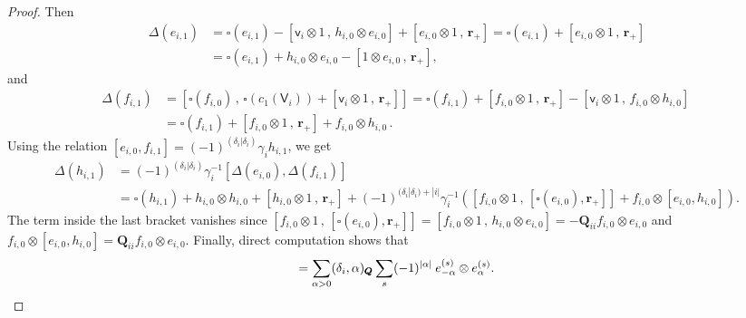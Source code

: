 \documentclass[10pt]{amsart}
\theoremstyle{definition}
\numberwithin{equation}{section}
\begin{document}
\begin{proof}
Then
\begin{align*}
\Delta(e_{i,1})&=\square(e_{i,1})-\left[\mathsf v_i\otimes 1\,,\,h_{i,0}\otimes e_{i,0}\right]+\left[e_{i,0}\otimes 1\,,\,\pmb r_+\right]=\square(e_{i,1})+\left[e_{i,0}\otimes 1\,,\,\pmb r_+\right]\\
&=\square(e_{i,1})+h_{i,0}\otimes e_{i,0}-\left[1\otimes e_{i,0}\,,\,\pmb r_+\right],
\end{align*}
and 
\begin{align*}
\Delta(f_{i,1})&=\left[\square(f_{i,0})\,,\, \square(c_1(\mathsf V_i)) +\left[\mathsf v_i\otimes 1\,,\,\pmb r_+\right]\right]=\square(f_{i,1})+\left[f_{i,0}\otimes 1\,,\,\pmb r_+\right]-\left[\mathsf v_i\otimes 1\,,\,f_{i,0}\otimes h_{i,0}\right]\,\\
&=\square(f_{i,1})+\left[f_{i,0}\otimes 1\,,\,\pmb r_+\right]+f_{i,0}\otimes h_{i,0}\,.
\end{align*}
Using the relation $[e_{i,0},f_{i,1}]=(-1)^{(\delta_i|\delta_i)}\gamma_i h_{i,1}$, we get
\begin{align*}
\Delta(h_{i,1})&=(-1)^{(\delta_i|\delta_i)}\gamma_i^{-1}[\Delta(e_{i,0}),\Delta(f_{i,1})]\\
&=\square(h_{i,1})+h_{i,0}\otimes h_{i,0}+[h_{i,0}\otimes 1\,,\, \pmb r_+]+(-1)^{(\delta_i|\delta_i)+|i|}\gamma_i^{-1}\left([f_{i,0}\otimes 1\,,\, [\square(e_{i,0}),\pmb r_+]]+f_{i,0}\otimes [e_{i,0},h_{i,0}]\right).
\end{align*}
The term inside the last bracket vanishes since $[f_{i,0}\otimes 1\,,\, [\square(e_{i,0}),\pmb r_+]]=[f_{i,0}\otimes 1\,,\, h_{i,0}\otimes e_{i,0}]=-\pmb Q_{ii}f_{i,0}\otimes e_{i,0}$ and $f_{i,0}\otimes [e_{i,0},h_{i,0}]=\pmb Q_{ii}f_{i,0}\otimes e_{i,0}$. Finally, direct computation shows that \begin{equation*}[h_{i,0}\otimes 1\,,\, \pmb r_+]=\sum_{\alpha>0}(\delta_i,\alpha)_{\pmb Q}\sum_s (-1)^{|\alpha|}\: e_{-\alpha}^{(s)}\otimes e_{\alpha}^{(s)}. \qedhere  \end{equation*}
\end{proof}
\end{document}
